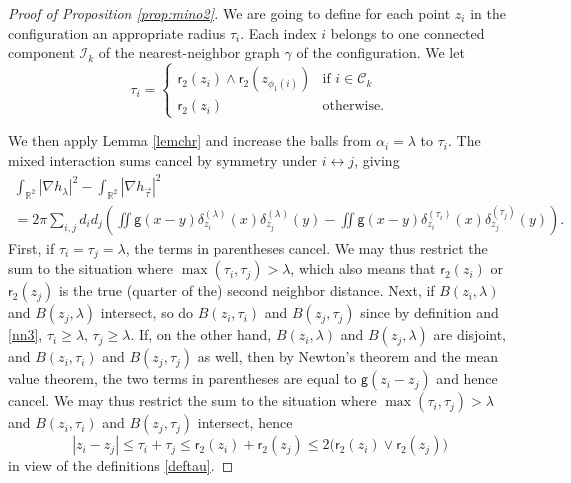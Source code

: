 \documentclass[a4paper,10pt,leqno]{amsart}
\numberwithin{equation}{section}
\newcommand{\R}{\mathbb{R}}
\def\nab{\nabla}
\def\g{\mathsf{g}}
\def\rr{\mathsf{r}}
\begin{document}
\begin{proof}[Proof of Proposition \ref{prop:mino2}]
  We are going to define for each point $z_i$ in the configuration an appropriate radius $\tau_i$.
  Each index $i$ belongs to one connected component $\mathcal{I}_k$ of the nearest-neighbor graph $\gamma$ of the configuration. We let
  \begin{equation}\label{deftau} \tau_i= \begin{cases}
      \rr_2(z_{i})\wedge \rr_2(z_{\phi_1(i) }) & \text{if $i\in \mathcal C_k$}\\
      \rr_2(z_i) & \text{otherwise}.\end{cases}\end{equation}

  We then apply Lemma \ref{lemchr} and increase the balls from $\alpha_i= \lambda $ to $\tau_i$.
  The mixed interaction sums cancel by symmetry under $i\leftrightarrow j$, giving
  \begin{multline}\label{peq}
    \int_{\R^2} |\nab h_{\lambda}|^2-
    \int_{\R^2} |\nab h_{\vec{\tau}}|^2\\=
    2\pi \sum_{i,j} d_i d_j \left(\iint \g(x-y) \delta_{z_i}^{(\lambda)} (x)
    \delta_{z_j}^{(\lambda)} (y)- \iint \g(x-y) \delta_{z_i}^{(\tau_i)} (x)
    \delta_{z_j}^{(\tau_j)} (y)
    \right)
    . \end{multline}
  First, if $\tau_i=\tau_j=\lambda$, the terms in parentheses cancel. We may thus restrict the sum to the situation where $\max (\tau_i, \tau_j) > \lambda$, which also means that $\rr_2(z_i)$ or $\rr_2(z_j)$ is the true (quarter of the) second neighbor distance.
  Next, if $B(z_i, \lambda) $ and $B(z_j, \lambda)$ intersect, so do $B(z_i, \tau_i) $ and $B(z_j, \tau_j)$ since by definition and \eqref{nn3}, $\tau_i\ge \lambda$, $\tau_j \ge \lambda$.
  If, on the other hand, $B(z_i,\lambda)$ and $B(z_j, \lambda)$ are disjoint, and $B(z_i, \tau_i)$ and $B(z_j, \tau_j)$ as well, then
  by Newton's theorem and the mean value theorem, the two terms in parentheses are equal to $\g(z_i-z_j)$ and hence cancel.
  We may thus restrict the sum to the situation where $\max(\tau_i, \tau_j) > \lambda$ and $B(z_i, \tau_i)$ and $B(z_j, \tau_j)$ intersect, hence
  \begin{equation}\label{disz}
    |z_i-z_j|\le \tau_i+\tau_j \le \rr_2(z_i) + \rr_2(z_j) \le 2\bigl(\rr_2(z_i)\vee\rr_2(z_j)\bigr) \end{equation} in view of the definitions \eqref{deftau}.


\end{proof}
\end{document}
